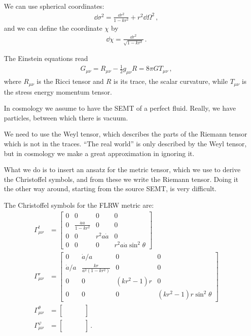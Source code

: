 \documentclass[main.tex]{subfiles}
\begin{document}
We can use spherical coordinates: 
%
\begin{align}
\dd{\sigma^2 } = \frac{ \dd{r^2}}{1 - k r^2} + r^2 \dd{\Omega^2}
\,,
\end{align}
%
and we can define the coordinate \(\chi \) by 
%
\begin{align}
\dd{\chi } = \frac{ \dd{r^2}}{\sqrt{1 - k r^2}}
\,.
\end{align}

The Einstein equations read 
%
\begin{align}
G_{\mu \nu } = R_{\mu \nu } - \frac{1}{2} g_{\mu \nu } R = 8 \pi G T_{\mu \nu }
\,,
\end{align}
%
where \(R_{\mu \nu }\) is the Ricci tensor and \(R\) is its trace, the scalar curvature, while \(T_{\mu \nu } \) is the stress energy momentum tensor. 

In cosmology we assume to have the SEMT of a perfect fluid. 
Really, we have particles, between which there is vacuum. 

We need to use the Weyl tensor, which describes the parts of the Riemann tensor which is not in the traces. 
``The real world'' is only described by the Weyl tensor, but in cosmology we make a great approximation in ignoring it. 

What we do is to insert an ansatz for the metric tensor, which we use to derive the Christoffel symbols, and from these we write the Riemann tensor. 
Doing it the other way around, starting from the source SEMT, is very difficult. 

The Christoffel symbols for the FLRW metric are: 
%
\begin{align}
\Gamma^{t}_{\mu \nu } &= \left[\begin{array}{cccc}
0 & 0 & 0 & 0 \\ 
0 & \frac{\dot{a}a}{1-kr^2} & 0 & 0 \\ 
0 & 0 & r^2a \dot{a} & 0 \\ 
0 & 0 & 0 & r^2 a \dot{a} \sin^2\theta 
\end{array}\right] \\
\Gamma^{r}_{\mu \nu } &= \left[\begin{array}{cccc}
0 & \dot{a} / a & 0 & 0 \\ 
\dot{a} / a & \frac{kr}{a^2 (1-kr^2)} & 0 & 0 \\ 
0 & 0 & (kr^2-1)r & 0 \\ 
0 & 0 & 0 & (kr^2-1)r \sin^2\theta 
\end{array}\right] \\
\Gamma^{\theta }_{\mu \nu } &= \left[\begin{array}{cccc}
 &  &  &  \\ 
 &  &  &  \\ 
 &  &  &  \\ 
 &  &  & 
\end{array}\right] \\
\Gamma^{\varphi }_{\mu \nu } &= \left[\begin{array}{cccc}
 &  &  &  \\ 
 &  &  &  \\ 
 &  &  &  \\ 
 &  &  & 
\end{array}\right]
\,.
\end{align}
\end{document}

